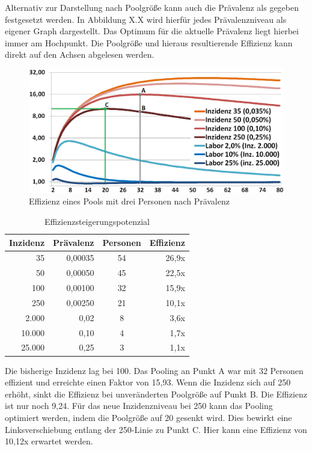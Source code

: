 \cleardoublepage

Alternativ zur Darstellung nach Poolgröße kann auch die Prävalenz als gegeben festgesetzt werden.
In Abbildung X.X wird hierfür jedes Prävalenzniveau als eigener Graph dargestellt.
Das Optimum für die aktuelle Prävalenz liegt hierbei immer am Hochpunkt.
Die Poolgröße und hieraus resultierende Effizienz kann direkt auf den Achsen abgelesen werden.
\begin{figure}[h]
	\centering
	\includegraphics[width=1\textwidth]{img/EffizienzTestgruppePfeile}
	\caption{Effizienz eines Pools mit drei Personen nach Prävalenz\footnotemark}
\end{figure}

\begin{table}
	\begin{tabular}{|r|r|c|r|}
		\hline
		Inzidenz&Prävalenz&Personen&Effizienz\\
		\hline
		35 & 0,00035 & 54 & 26,9x\\
		\hline
		50 & 0,00050 & 45 & 22,5x \\
		\hline
		100 & 0,00100 & 32 & 15,9x \\
		\hline
		250 & 0,00250 & 21 & 10,1x \\
		\hline
		2.000 & 0,02 & 8 & 3,6x\\
		\hline
		10.000 & 0,10  & 4 & 1,7x\\
		\hline
		25.000 & 0,25 & 3 & 1,1x\\
		\hline
	\end{tabular}
	\caption{Effizienzsteigerungspotenzial\footnotemark}
\end{table} 
Die bisherige Inzidenz lag bei 100.
Das Pooling an Punkt A war mit 32 Personen effizient und erreichte einen Faktor von 15,93.
Wenn die Inzidenz sich auf 250 erhöht, sinkt die Effizienz bei unveränderten Poolgröße auf Punkt B. Die Effizienz ist nur noch 9,24.
Für das neue Inzidenzniveau bei 250 kann das Pooling optimiert werden, indem die Poolgröße auf 20 gesenkt wird.
Dies bewirkt eine Linksverschiebung entlang der 250-Linie zu Punkt C.
Hier kann eine Effizienz von 10,12x erwartet werden.

